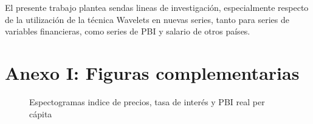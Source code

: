 \documentclass[a4paper]{article}
\begin{document}
El presente trabajo plantea sendas lineas de investigación, especialmente respecto de la utilización de la técnica Wavelets en nuevas series, tanto para series de variables financieras, como series de PBI y salario de otros países.







\renewcommand{\appendixname}{Anexos}
\renewcommand{\appendixtocname}{Anexos}
\renewcommand{\appendixpagename}{Anexos}

\appendix

\section{Anexo I: Figuras complementarias}


\begin{figure}[H]
	\centering
	\caption{Espectogramas indice de precios, tasa de interés y PBI real per cápita}
	\label{fig:spectogram_IPC_IR_real_GDP}
\end{figure}
\end{document}
